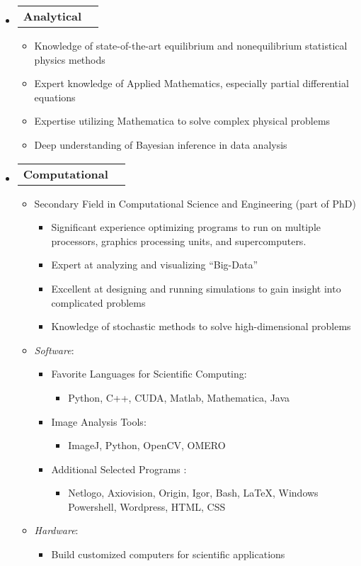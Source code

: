 \documentclass[letterpaper,11pt]{article}
\makeatletter
\newcommand{\resitem}[1]{\item #1 \vspace{-2pt}}
\newcommand{\award}[2]{\vspace{-5pt}
\begin{tabular*}{7.0in}{l@{\extracolsep{\fill}}r}
		\textbf{#1} & #2 
\end{tabular*}\vspace{-8pt}}
\makeatother
\begin{document}
\begin{itemize}

\item \award{Analytical}{}
\begin{itemize}
\resitem{Knowledge of state-of-the-art equilibrium and nonequilibrium statistical physics methods}
\resitem{Expert knowledge of Applied Mathematics, especially partial differential equations}
\resitem{Expertise utilizing Mathematica to solve complex physical problems}
\resitem{Deep understanding of Bayesian inference in data analysis}
\end{itemize}

\item \award{Computational}{}

\begin{itemize}

\resitem{Secondary Field in Computational Science and Engineering (part of PhD)}
	\begin{itemize}
	\resitem{Significant experience optimizing programs to run on multiple processors, graphics processing units, and supercomputers.}
	\resitem{Expert at analyzing and visualizing ``Big-Data''}
	\resitem{Excellent at designing and running simulations to gain insight into complicated problems}
	\resitem{Knowledge of stochastic methods to solve high-dimensional problems}
	\end{itemize}


\resitem{\textit{Software}:}

\begin{itemize}

	\resitem{Favorite Languages for Scientific Computing:} 
		\begin{itemize}
		\resitem{Python, C++, CUDA, Matlab, Mathematica, Java}
		\end{itemize}
		
	\resitem{Image Analysis Tools:}
		\begin{itemize}
		\resitem{ImageJ, Python, OpenCV, OMERO}
		\end{itemize}
	
	\resitem{Additional Selected Programs}:
		\begin{itemize}
		\resitem{Netlogo, Axiovision, Origin, Igor, Bash, \LaTeX, Windows Powershell, Wordpress, HTML, CSS}
		\end{itemize}
	
\end{itemize}

\resitem{\textit{Hardware}:} 
	\begin{itemize}
	\resitem{Build customized computers for scientific applications}
	\end{itemize}


\end{itemize}
\end{itemize}
\end{document}
